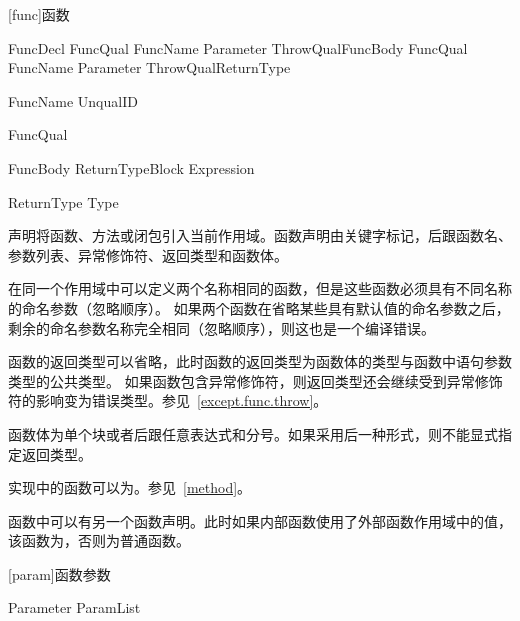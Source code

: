 
[func]{函数}

\begin{bnf}{FuncDecl}
    FuncQual\bnfs {} FuncName Parameter ThrowQual\bnfq FuncBody \br
    FuncQual\bnfs {} FuncName Parameter ThrowQual\bnfq ReturnType\bnfq \terminal{;}
\end{bnf}

\begin{bnf}{FuncName}
    UnqualID
\end{bnf}

\begin{bnf}{FuncQual}
     \br
     \br
     \br
\end{bnf}

\begin{bnf}{FuncBody}
    ReturnType\bnfq Block \br
    \terminal{=>} Expression \terminal{;}
\end{bnf}

\begin{bnf}{ReturnType}
    \terminal{->} Type
\end{bnf}

\pnum
{}声明将函数、方法或闭包引入当前作用域。函数声明由关键字标记，后跟函数名、参数列表、异常修饰符、返回类型和函数体。

\pnum
在同一个作用域中可以定义两个名称相同的函数，但是这些函数必须具有不同名称的命名参数（忽略顺序）。
如果两个函数在省略某些具有默认值的命名参数之后，剩余的命名参数名称完全相同（忽略顺序），则这也是一个编译错误。

\pnum
函数的返回类型可以省略，此时函数的返回类型为函数体的类型与函数中语句参数类型的公共类型。
如果函数包含异常修饰符，则返回类型还会继续受到异常修饰符的影响变为错误类型。参见~\ref{except.func.throw}。

\pnum
函数体为单个块或者\tcode{=>}后跟任意表达式和分号。如果采用后一种形式，则不能显式指定返回类型。

\pnum
实现中的函数可以为。参见~\ref{method}。

\pnum
函数中可以有另一个函数声明。此时如果内部函数使用了外部函数作用域中的值，该函数为，否则为普通函数。

[param]{函数参数}

\begin{bnf}{Parameter}
    \terminal{(} ParamList\bnfq \terminal{)}
\end{bnf}

